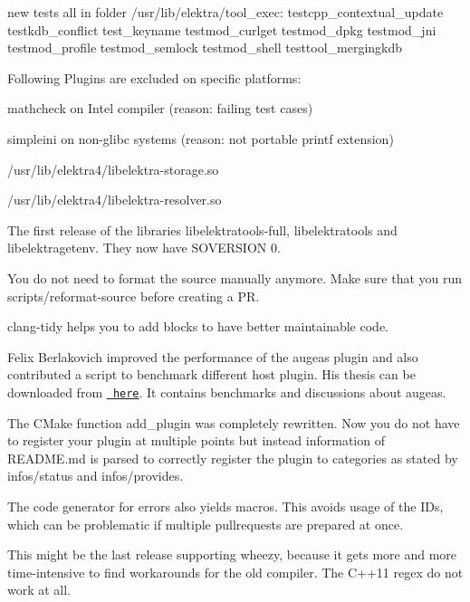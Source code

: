 new tests all in folder /usr/lib/elektra/tool\+\_\+exec\+: testcpp\+\_\+contextual\+\_\+update testkdb\+\_\+conflict test\+\_\+keyname testmod\+\_\+curlget testmod\+\_\+dpkg testmod\+\_\+jni testmod\+\_\+profile testmod\+\_\+semlock testmod\+\_\+shell testtool\+\_\+mergingkdb

Following Plugins are excluded on specific platforms\+:


\begin{DoxyItemize}
\item mathcheck on Intel compiler (reason\+: failing test cases)
\item simpleini on non-\/glibc systems (reason\+: not portable printf extension)
\end{DoxyItemize}


\begin{DoxyItemize}
\item /usr/lib/elektra4/libelektra-\/storage.so
\item /usr/lib/elektra4/libelektra-\/resolver.so
\end{DoxyItemize}

The first release of the libraries libelektratools-\/full, libelektratools and libelektragetenv. They now have S\+O\+V\+E\+R\+S\+I\+ON 0.

You do not need to format the source manually anymore. Make sure that you run scripts/reformat-\/source before creating a PR.

{\ttfamily clang-\/tidy} helps you to add blocks to have better maintainable code.

Felix Berlakovich improved the performance of the augeas plugin and also contributed a script to benchmark different host plugin. His thesis can be downloaded from \href{https://www.libelektra.org/ftp/elektra/berlakovich2016universal.pdf}{\texttt{ here}}. It contains benchmarks and discussions about augeas.

The C\+Make function {\ttfamily add\+\_\+plugin} was completely rewritten. Now you do not have to register your plugin at multiple points but instead information of R\+E\+A\+D\+M\+E.\+md is parsed to correctly register the plugin to categories as stated by {\ttfamily infos/status} and {\ttfamily infos/provides}.

The code generator for errors also yields macros. This avoids usage of the I\+Ds, which can be problematic if multiple pullrequests are prepared at once.

This might be the last release supporting wheezy, because it gets more and more time-\/intensive to find workarounds for the old compiler. The C++11 regex do not work at all.

